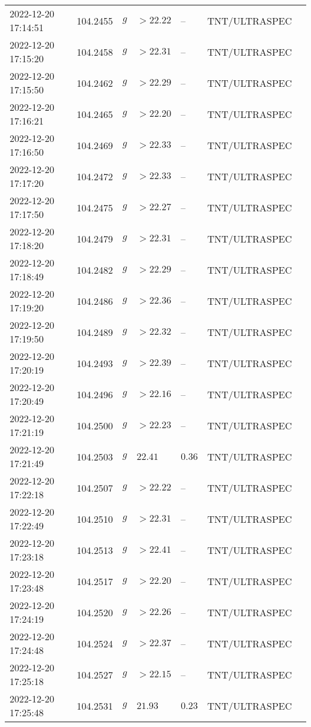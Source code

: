 \documentclass{nature_plusfigure}
\begin{document}
\begin{supplement}
\begin{center}
\begin{longtable}{lllllll}
2022-12-20 17:14:51 & 104.2455 & $g$ & $>22.22$ & -- & TNT/ULTRASPEC &  \\ 
2022-12-20 17:15:20 & 104.2458 & $g$ & $>22.31$ & -- & TNT/ULTRASPEC &  \\ 
2022-12-20 17:15:50 & 104.2462 & $g$ & $>22.29$ & -- & TNT/ULTRASPEC &  \\ 
2022-12-20 17:16:21 & 104.2465 & $g$ & $>22.20$ & -- & TNT/ULTRASPEC &  \\ 
2022-12-20 17:16:50 & 104.2469 & $g$ & $>22.33$ & -- & TNT/ULTRASPEC &  \\ 
2022-12-20 17:17:20 & 104.2472 & $g$ & $>22.33$ & -- & TNT/ULTRASPEC &  \\ 
2022-12-20 17:17:50 & 104.2475 & $g$ & $>22.27$ & -- & TNT/ULTRASPEC &  \\ 
2022-12-20 17:18:20 & 104.2479 & $g$ & $>22.31$ & -- & TNT/ULTRASPEC &  \\ 
2022-12-20 17:18:49 & 104.2482 & $g$ & $>22.29$ & -- & TNT/ULTRASPEC &  \\ 
2022-12-20 17:19:20 & 104.2486 & $g$ & $>22.36$ & -- & TNT/ULTRASPEC &  \\ 
2022-12-20 17:19:50 & 104.2489 & $g$ & $>22.32$ & -- & TNT/ULTRASPEC &  \\ 
2022-12-20 17:20:19 & 104.2493 & $g$ & $>22.39$ & -- & TNT/ULTRASPEC &  \\ 
2022-12-20 17:20:49 & 104.2496 & $g$ & $>22.16$ & -- & TNT/ULTRASPEC &  \\ 
2022-12-20 17:21:19 & 104.2500 & $g$ & $>22.23$ & -- & TNT/ULTRASPEC &  \\ 
2022-12-20 17:21:49 & 104.2503 & $g$ & $22.41$ & $0.36$ & TNT/ULTRASPEC &  \\ 
2022-12-20 17:22:18 & 104.2507 & $g$ & $>22.22$ & -- & TNT/ULTRASPEC &  \\ 
2022-12-20 17:22:49 & 104.2510 & $g$ & $>22.31$ & -- & TNT/ULTRASPEC &  \\ 
2022-12-20 17:23:18 & 104.2513 & $g$ & $>22.41$ & -- & TNT/ULTRASPEC &  \\ 
2022-12-20 17:23:48 & 104.2517 & $g$ & $>22.20$ & -- & TNT/ULTRASPEC &  \\ 
2022-12-20 17:24:19 & 104.2520 & $g$ & $>22.26$ & -- & TNT/ULTRASPEC &  \\ 
2022-12-20 17:24:48 & 104.2524 & $g$ & $>22.37$ & -- & TNT/ULTRASPEC &  \\ 
2022-12-20 17:25:18 & 104.2527 & $g$ & $>22.15$ & -- & TNT/ULTRASPEC &  \\ 
2022-12-20 17:25:48 & 104.2531 & $g$ & $21.93$ & $0.23$ & TNT/ULTRASPEC &  \\ 

\end{longtable}
\end{center}
\end{supplement}
\end{document}
